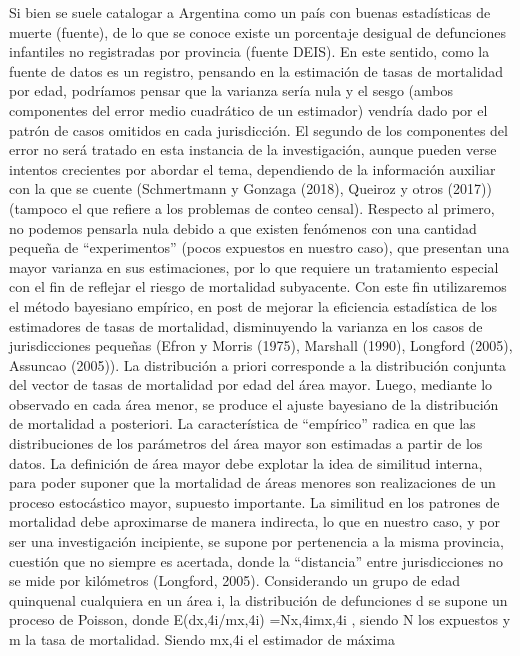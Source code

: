 \documentclass[12pt,spanish,]{article}
\begin{document}
Si bien se suele catalogar a Argentina como un país con buenas
estadísticas de muerte (fuente), de lo que se conoce existe un
porcentaje desigual de defunciones infantiles no registradas por
provincia (fuente DEIS). En este sentido, como la fuente de datos es un
registro, pensando en la estimación de tasas de mortalidad por edad,
podríamos pensar que la varianza sería nula y el sesgo (ambos
componentes del error medio cuadrático de un estimador) vendría dado por
el patrón de casos omitidos en cada jurisdicción. El segundo de los
componentes del error no será tratado en esta instancia de la
investigación, aunque pueden verse intentos crecientes por abordar el
tema, dependiendo de la información auxiliar con la que se cuente
(Schmertmann y Gonzaga (2018), Queiroz y otros (2017)) (tampoco el que
refiere a los problemas de conteo censal). Respecto al primero, no
podemos pensarla nula debido a que existen fenómenos con una cantidad
pequeña de \enquote{experimentos} (pocos expuestos en nuestro caso), que
presentan una mayor varianza en sus estimaciones, por lo que requiere un
tratamiento especial con el fin de reflejar el riesgo de mortalidad
subyacente. Con este fin utilizaremos el método bayesiano empírico, en
post de mejorar la eficiencia estadística de los estimadores de tasas de
mortalidad, disminuyendo la varianza en los casos de jurisdicciones
pequeñas (Efron y Morris (1975), Marshall (1990), Longford (2005),
Assuncao (2005)). La distribución a priori corresponde a la distribución
conjunta del vector de tasas de mortalidad por edad del área mayor.
Luego, mediante lo observado en cada área menor, se produce el ajuste
bayesiano de la distribución de mortalidad a posteriori. La
característica de \enquote{empírico} radica en que las distribuciones de
los parámetros del área mayor son estimadas a partir de los datos. La
definición de área mayor debe explotar la idea de similitud interna,
para poder suponer que la mortalidad de áreas menores son realizaciones
de un proceso estocástico mayor, supuesto importante. La similitud en
los patrones de mortalidad debe aproximarse de manera indirecta, lo que
en nuestro caso, y por ser una investigación incipiente, se supone por
pertenencia a la misma provincia, cuestión que no siempre es acertada,
donde la \enquote{distancia} entre jurisdicciones no se mide por
kilómetros (Longford, 2005). Considerando un grupo de edad quinquenal
cualquiera en un área i, la distribución de defunciones d se supone un
proceso de Poisson, donde E(dx,4i/mx,4i) =Nx,4imx,4i , siendo N los
expuestos y m la tasa de mortalidad. Siendo mx,4i el estimador de máxima
\end{document}
